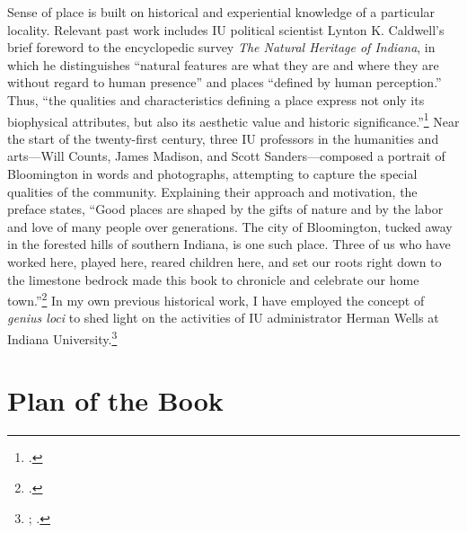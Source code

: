 \documentclass[
  american,
  letterpaper,
]{scrreprt}
\begin{document}
Sense of place is built on historical and experiential knowledge of a
particular locality. Relevant past work includes IU political scientist
Lynton K. Caldwell's brief foreword to the encyclopedic survey \emph{The
Natural Heritage of Indiana}, in which he distinguishes ``natural
features are what they are and where they are without regard to human
presence'' and places ``defined by human perception.'' Thus, ``the
qualities and characteristics defining a place express not only its
biophysical attributes, but also its aesthetic value and historic
significance.''\footnote{.} Near the start of the twenty-first
century, three IU professors in the humanities and arts---Will Counts,
James Madison, and Scott Sanders---composed a portrait of Bloomington in
words and photographs, attempting to capture the special qualities of
the community. Explaining their approach and motivation, the preface
states, ``Good places are shaped by the gifts of nature and by the labor
and love of many people over generations. The city of Bloomington,
tucked away in the forested hills of southern Indiana, is one such
place. Three of us who have worked here, played here, reared children
here, and set our roots right down to the limestone bedrock made this
book to chronicle and celebrate our home town.''\footnote{.}
In my own previous historical work, I have employed the concept of
\emph{genius loci} to shed light on the activities of IU administrator
Herman Wells at Indiana University.\footnote{;
  .}

\section*{Plan of the Book}\label{plan-of-the-book}
\end{document}
